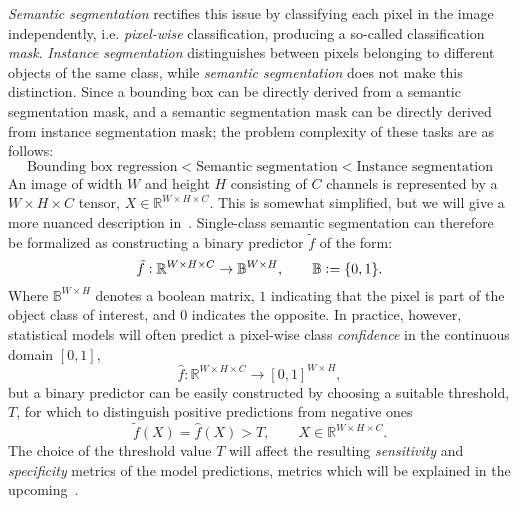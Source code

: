 \textit{Semantic segmentation} rectifies this issue by classifying each pixel in the image independently, i.e. \textit{pixel-wise} classification, producing a so-called classification \textit{mask}.
\textit{Instance segmentation} distinguishes between pixels belonging to different objects of the same class, while \textit{semantic segmentation} does not make this distinction.
Since a bounding box can be directly derived from a semantic segmentation mask, and a semantic segmentation mask can be directly derived from instance segmentation mask; the problem complexity of these tasks are as follows:
%
\begin{equation*}
  \text{Bounding box regression}
  <
  \text{Semantic segmentation}
  <
  \text{Instance segmentation}
\end{equation*}
%
An image of width $W$ and height $H$ consisting of $C$ channels is represented by a $W \times H \times C$ tensor, $X \in \mathbb{R}^{W \times H \times C}$.
This is somewhat simplified, but we will give a more nuanced description in~.
Single-class semantic segmentation can therefore be formalized as constructing a binary predictor $\tilde{f}$ of the form:
%
\begin{equation*}
  \tilde{f}: \mathbb{R}^{W \times H \times C} \rightarrow \mathbb{B}^{W \times H}, \hspace{2em} \mathbb{B} \vcentcolon= \{0, 1\}.
\end{equation*}
%
Where $\mathbb{B}^{W \times H}$ denotes a boolean matrix, $1$ indicating that the pixel is part of the object class of interest, and $0$ indicates the opposite.
In practice, however, statistical models will often predict a pixel-wise class \textit{confidence} in the continuous domain $[0, 1]$,
%
\begin{equation*}
  \hat{f}: \mathbb{R}^{W \times H \times C} \rightarrow {[0, 1]}^{W \times H},
\end{equation*}
%
but a binary predictor can be easily constructed by choosing a suitable threshold, $T$, for which to distinguish positive predictions from negative ones
%
\begin{equation*}
  \tilde{f}(X) = \hat{f}(X) > T, \hspace{2em} X \in \mathbb{R}^{W \times H \times C}.
\end{equation*}
%
The choice of the threshold value $T$ will affect the resulting \textit{sensitivity} and \textit{specificity} metrics of the model predictions, metrics which will be explained in the upcoming~.

